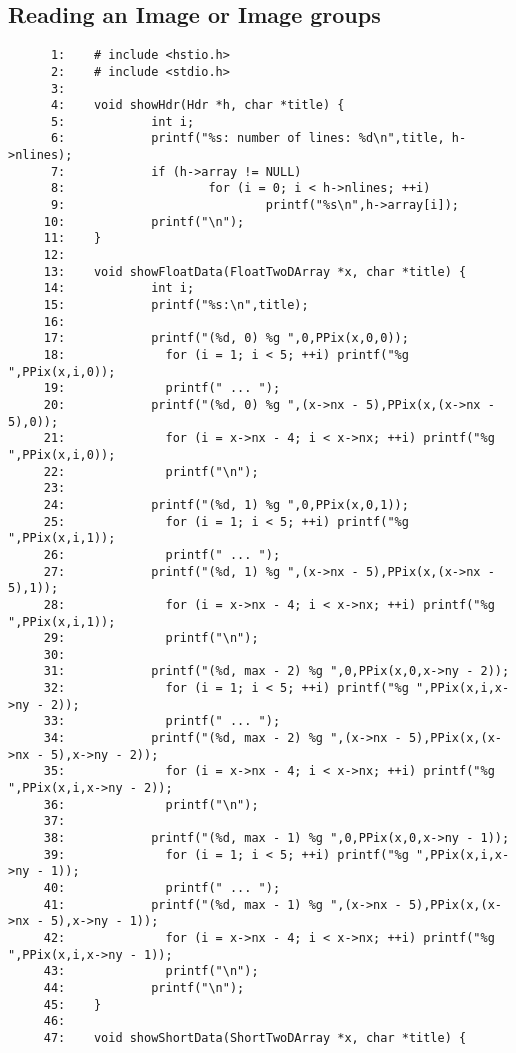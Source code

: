 \subsection{Reading an Image or Image groups}
\begin{scriptsize}
\begin{verbatim}
      1:    # include <hstio.h>
      2:    # include <stdio.h>
      3:    
      4:    void showHdr(Hdr *h, char *title) {
      5:            int i;
      6:            printf("%s: number of lines: %d\n",title, h->nlines);
      7:            if (h->array != NULL)
      8:                    for (i = 0; i < h->nlines; ++i)
      9:                            printf("%s\n",h->array[i]);
     10:            printf("\n");
     11:    }
     12:    
     13:    void showFloatData(FloatTwoDArray *x, char *title) {
     14:            int i;
     15:            printf("%s:\n",title);
     16:    
     17:            printf("(%d, 0) %g ",0,PPix(x,0,0));
     18:              for (i = 1; i < 5; ++i) printf("%g ",PPix(x,i,0)); 
     19:              printf(" ... ");
     20:            printf("(%d, 0) %g ",(x->nx - 5),PPix(x,(x->nx - 5),0));
     21:              for (i = x->nx - 4; i < x->nx; ++i) printf("%g ",PPix(x,i,0));
     22:              printf("\n");
     23:    
     24:            printf("(%d, 1) %g ",0,PPix(x,0,1));
     25:              for (i = 1; i < 5; ++i) printf("%g ",PPix(x,i,1)); 
     26:              printf(" ... ");
     27:            printf("(%d, 1) %g ",(x->nx - 5),PPix(x,(x->nx - 5),1));
     28:              for (i = x->nx - 4; i < x->nx; ++i) printf("%g ",PPix(x,i,1));
     29:              printf("\n");
     30:    
     31:            printf("(%d, max - 2) %g ",0,PPix(x,0,x->ny - 2));
     32:              for (i = 1; i < 5; ++i) printf("%g ",PPix(x,i,x->ny - 2)); 
     33:              printf(" ... ");
     34:            printf("(%d, max - 2) %g ",(x->nx - 5),PPix(x,(x->nx - 5),x->ny - 2));
     35:              for (i = x->nx - 4; i < x->nx; ++i) printf("%g ",PPix(x,i,x->ny - 2));
     36:              printf("\n");
     37:    
     38:            printf("(%d, max - 1) %g ",0,PPix(x,0,x->ny - 1));
     39:              for (i = 1; i < 5; ++i) printf("%g ",PPix(x,i,x->ny - 1)); 
     40:              printf(" ... ");
     41:            printf("(%d, max - 1) %g ",(x->nx - 5),PPix(x,(x->nx - 5),x->ny - 1));
     42:              for (i = x->nx - 4; i < x->nx; ++i) printf("%g ",PPix(x,i,x->ny - 1));
     43:              printf("\n");
     44:            printf("\n");
     45:    }
     46:    
     47:    void showShortData(ShortTwoDArray *x, char *title) {

\end{verbatim}
\end{scriptsize}
